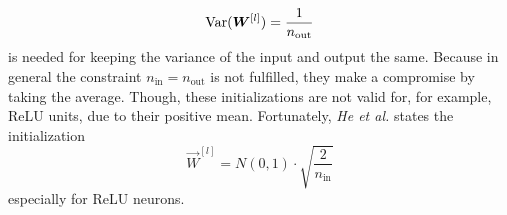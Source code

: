 \begin{equation}
	\operatorname{\mathrm{Var}}(\bm{W}^{[l]}) = \frac{1}{n_{\text{out}}}
\end{equation}
is needed for keeping the variance of the input and output the same.
Because in general the constraint $n_{\text{in}} = n_{\text{out}}$ is not fulfilled, they make a compromise by taking the average.
Though, these initializations are not valid for, for example, ReLU units, due to their positive mean.
Fortunately, \textit{He et al.} \cite{DBLP:journals/corr/HeZR015} states the initialization
\begin{equation}
	\vec{W}^{[l]} = N(0,1) \cdot \sqrt{\frac{2}{n_{\text{in}}}}
\end{equation}
especially for ReLU neurons.